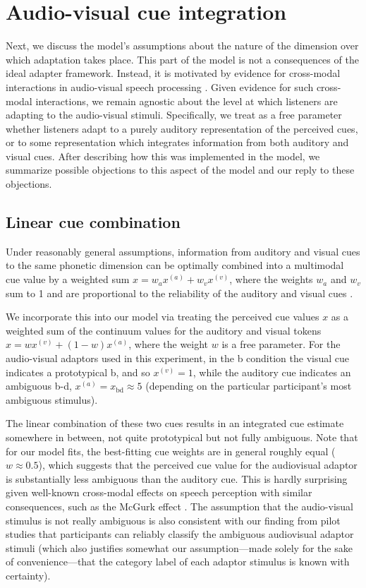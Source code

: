 \section{Audio-visual cue integration}
\label{sec:audio-visual-cue}

Next, we discuss the model's assumptions about the nature of the dimension over which adaptation takes place. This part of the model is not a consequences of the ideal adapter framework. Instead, it is motivated by evidence for cross-modal interactions in audio-visual speech processing \autocite{Bejjanki2011,McGurk1976}. Given evidence for such cross-modal interactions, we remain agnostic about the level at which listeners are adapting to the audio-visual stimuli. Specifically, we treat as a free parameter whether listeners adapt to a purely auditory representation of the perceived cues, or to some representation which integrates information from both auditory and visual cues. After describing how this was implemented in the model, we summarize possible objections to this aspect of the model and our reply to these objections.

\subsection{Linear cue combination}
\label{sec:line-cue-comb}

Under reasonably general assumptions, information from auditory and visual cues to the same phonetic dimension can be optimally combined into a multimodal cue value by a weighted sum $x=w_a x^{(a)} + w_v x^{(v)}$, where the weights $w_a$ and $w_v$ sum to 1 and are proportional to the reliability of the auditory and visual cues \autocite{Bejjanki2011,Ernst2002,Jacobs2002,Knill2003,Toscano2010}.

We incorporate this into our model via treating the perceived cue values $x$ as a weighted sum of the continuum values for the auditory and visual tokens $x=wx^{(v)} + (1-w)x^{(a)}$, where the weight $w$ is a free parameter.  For the audio-visual adaptors used in this experiment, in the \ph b condition the visual cue indicates a prototypical \ph b, and so $x^{(v)} = 1$, while the auditory cue indicates an ambiguous \ph b-\ph d, $x^{(a)} = x_\mathrm{bd} \approx 5$ (depending on the particular participant's most ambiguous stimulus).

The linear combination of these two cues results in an integrated cue estimate somewhere in between, not quite prototypical but not fully ambiguous.  Note that for our model fits, the best-fitting cue weights are in general roughly equal ($w\approx 0.5$), which suggests that the perceived cue value for the audiovisual adaptor is substantially less ambiguous than the auditory cue. This is hardly surprising given well-known cross-modal effects on speech perception with similar consequences, such as the McGurk effect \autocite{McGurk1976}.
The assumption that the audio-visual stimulus is  not really ambiguous is also consistent with our finding from pilot studies that participants can reliably classify the ambiguous audiovisual adaptor stimuli (which also justifies somewhat our assumption---made solely for the sake of convenience---that the category label of each adaptor stimulus is known with certainty).

